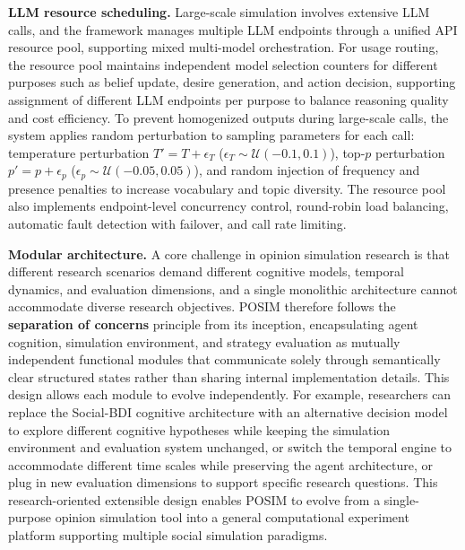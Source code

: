 \documentclass[a4paper,fleqn]{cas-dc}
\begin{document}
\textbf{LLM resource scheduling.} Large-scale simulation involves extensive LLM calls, and the framework manages multiple LLM endpoints through a unified API resource pool, supporting mixed multi-model orchestration. For usage routing, the resource pool maintains independent model selection counters for different purposes such as belief update, desire generation, and action decision, supporting assignment of different LLM endpoints per purpose to balance reasoning quality and cost efficiency. To prevent homogenized outputs during large-scale calls, the system applies random perturbation to sampling parameters for each call: temperature perturbation $T' = T + \epsilon_T$ ($\epsilon_T \sim \mathcal{U}(-0.1, 0.1)$), top-$p$ perturbation $p' = p + \epsilon_p$ ($\epsilon_p \sim \mathcal{U}(-0.05, 0.05)$), and random injection of frequency and presence penalties to increase vocabulary and topic diversity. The resource pool also implements endpoint-level concurrency control, round-robin load balancing, automatic fault detection with failover, and call rate limiting.

\textbf{Modular architecture.} A core challenge in opinion simulation research is that different research scenarios demand different cognitive models, temporal dynamics, and evaluation dimensions, and a single monolithic architecture cannot accommodate diverse research objectives. POSIM therefore follows the \textbf{separation of concerns} principle from its inception, encapsulating agent cognition, simulation environment, and strategy evaluation as mutually independent functional modules that communicate solely through semantically clear structured states rather than sharing internal implementation details. This design allows each module to evolve independently. For example, researchers can replace the Social-BDI cognitive architecture with an alternative decision model to explore different cognitive hypotheses while keeping the simulation environment and evaluation system unchanged, or switch the temporal engine to accommodate different time scales while preserving the agent architecture, or plug in new evaluation dimensions to support specific research questions. This research-oriented extensible design enables POSIM to evolve from a single-purpose opinion simulation tool into a general computational experiment platform supporting multiple social simulation paradigms.

\end{document}
